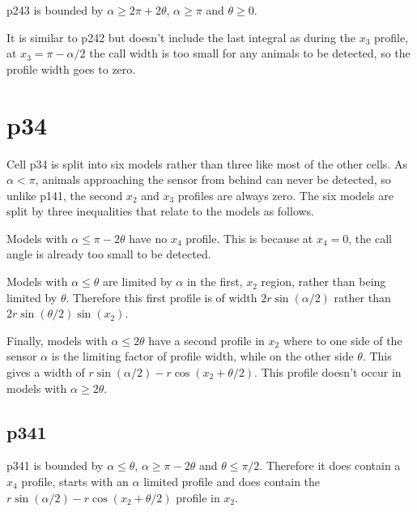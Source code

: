 p243 is bounded by $\alpha \ge 2\pi + 2\theta$, $\alpha \ge \pi$ and $\theta \ge 0$.

It is similar to p242 but doesn't include the last integral as during the $x_3$ profile, at $x_3 = \pi - \alpha/2$ the call width is too small for any animals to be detected, so the profile width goes to zero.







\section{p34} \label{p34}

Cell p34 is split into six models rather than three like most of the other cells. As $\alpha < \pi$, animals approaching the sensor from behind can never be detected, so unlike p141, the second $x_2$ and $x_3$ profiles are always zero. The six models are split by three inequalities that relate to the models as follows.

Models with $\alpha \le \pi - 2\theta$  have no $x_4$ profile. This is because at $x_4 = 0$, the call angle is already too small to be detected.

Models with $\alpha \le \theta$ are limited by $\alpha$ in the first, $x_2$ region, rather than being limited by $\theta$. Therefore this first profile is of width $2r\sin(\alpha/2)$ rather than $2r\sin(\theta/2)\sin(x_2)$.

Finally, models with $\alpha \le 2\theta$ have a second profile in $x_2$ where to one side of the sensor $\alpha$ is the limiting factor of profile width, while on the other side $\theta$. This gives a width of $r\sin(\alpha/2) - r\cos(x_2 + \theta/2)$. This profile doesn't occur in models with $\alpha \ge 2\theta$.

\subsection{p341} \label{p341}

p341 is bounded by $\alpha \le \theta$, $\alpha \ge \pi - 2\theta$ and $\theta \le \pi/2$. Therefore it does contain a $x_4$ profile, starts with an $\alpha$ limited profile and does contain the $r\sin(\alpha/2) - r\cos(x_2 + \theta/2)$ profile in $x_2$.



